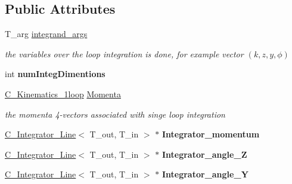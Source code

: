 \subsection*{Public Attributes}
\begin{DoxyCompactItemize}
\item 
\hypertarget{class_c___one_loop_integrator_a196a8d045623e4af5d4bb9fca7c105bb}{T\-\_\-arg \hyperlink{class_c___one_loop_integrator_a196a8d045623e4af5d4bb9fca7c105bb}{integrand\-\_\-args}}\label{class_c___one_loop_integrator_a196a8d045623e4af5d4bb9fca7c105bb}

\begin{DoxyCompactList}\small\item\em the variables over the loop integration is done, for example vector $ (k,z,y,\phi) $ \end{DoxyCompactList}\item 
\hypertarget{class_c___one_loop_integrator_aed8066a37eaa0865bd484ffd18884abb}{int {\bfseries num\-Integ\-Dimentions}}\label{class_c___one_loop_integrator_aed8066a37eaa0865bd484ffd18884abb}

\item 
\hypertarget{class_c___one_loop_integrator_a47a4a2f9a811fb4cd92824ea6561d18b}{\hyperlink{class_c___kinematics__1loop}{C\-\_\-\-Kinematics\-\_\-1loop} \hyperlink{class_c___one_loop_integrator_a47a4a2f9a811fb4cd92824ea6561d18b}{Momenta}}\label{class_c___one_loop_integrator_a47a4a2f9a811fb4cd92824ea6561d18b}

\begin{DoxyCompactList}\small\item\em the momenta 4-\/vectors associated with singe loop integration \end{DoxyCompactList}\item 
\hypertarget{class_c___one_loop_integrator_af884706bf7461487cfb254d78b797e94}{\hyperlink{class_c___integrator___line}{C\-\_\-\-Integrator\-\_\-\-Line}$<$ T\-\_\-out, T\-\_\-in $>$ $\ast$ {\bfseries Integrator\-\_\-momentum}}\label{class_c___one_loop_integrator_af884706bf7461487cfb254d78b797e94}

\item 
\hypertarget{class_c___one_loop_integrator_a2826eadcd033a03808d645cd883acceb}{\hyperlink{class_c___integrator___line}{C\-\_\-\-Integrator\-\_\-\-Line}$<$ T\-\_\-out, T\-\_\-in $>$ $\ast$ {\bfseries Integrator\-\_\-angle\-\_\-\-Z}}\label{class_c___one_loop_integrator_a2826eadcd033a03808d645cd883acceb}

\item 
\hypertarget{class_c___one_loop_integrator_a5770d28cb44d0ea9c3d331203ee84440}{\hyperlink{class_c___integrator___line}{C\-\_\-\-Integrator\-\_\-\-Line}$<$ T\-\_\-out, T\-\_\-in $>$ $\ast$ {\bfseries Integrator\-\_\-angle\-\_\-\-Y}}\label{class_c___one_loop_integrator_a5770d28cb44d0ea9c3d331203ee84440}


\end{DoxyCompactItemize}
